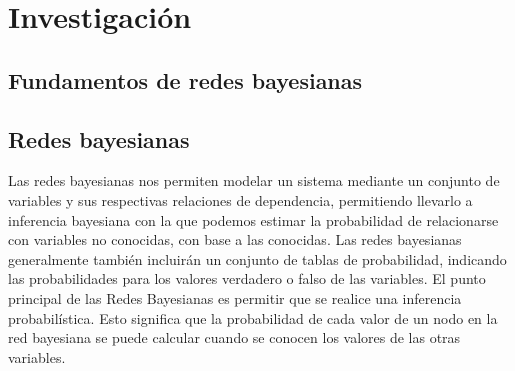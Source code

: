 \section{Investigación}

\subsection{Fundamentos de redes bayesianas}


\subsection*{Redes bayesianas}
Las redes bayesianas nos permiten modelar un sistema mediante un conjunto de variables y sus respectivas relaciones de dependencia, permitiendo llevarlo a inferencia bayesiana con la que podemos estimar la probabilidad de relacionarse con variables no conocidas, con base a las conocidas. Las redes bayesianas generalmente también incluirán un conjunto de tablas de probabilidad, indicando las probabilidades para los valores verdadero o falso de las variables. 
El punto principal de las Redes Bayesianas es permitir que se realice una inferencia probabilística. Esto significa que la probabilidad de cada valor de un nodo en la red bayesiana se puede calcular cuando se conocen los valores de las otras variables.\\ 

